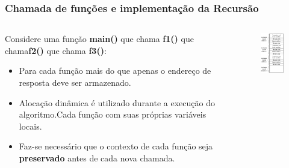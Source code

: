 \documentclass[10pt, handout]{beamer}
\begin{document}
\begin{frame}
  \frametitle{Chamada de funções e implementação da Recursão}
  \begin{columns}[t]
    \begin{column}{6cm}
      Considere uma função \textbf{main()} que chama \textbf{f1()} que chama\textbf{f2()} que chama \textbf{f3()}:
      \begin{itemize}
        \item Para cada função mais do que apenas o endereço de resposta deve ser armazenado.
        \item Alocação dinâmica é utilizado durante a execução do algoritmo.Cada função com suas próprias variáveis locais.
        \item Faz-se necessário que o contexto de cada função seja \textbf{preservado} antes de cada nova chamada.
      \end{itemize}
    \end{column}
    \begin{column}{6cm}
      \begin{figure}[h]
        \begin{center}
          \includegraphics[width=4cm]{fig/img05}
        \end{center}
      \end{figure}
    \end{column}
  \end{columns}
\end{frame}
\end{document}
